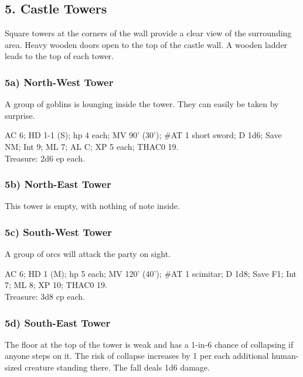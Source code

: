 \documentclass[english,12pt,openany,letterpaper]{book}
\begin{document}
\break

\subsection{5. Castle Towers}

Square towers at the corners of the wall provide a clear view of the surrounding area. Heavy wooden doors open to the top of the castle wall. A wooden ladder leads to the top of each tower.

\subsubsection{5a) North-West Tower}

A group of goblins is lounging inside the tower. They can easily be taken by surprise.

AC 6; HD 1-1 (S); hp 4 each; MV 90' (30'); \#AT 1 short sword; D 1d6; Save NM; Int 9; ML 7; AL C; XP 5 each; THAC0 19.
\\Treasure: 2d6 ep each.

\subsubsection{5b) North-East Tower}

This tower is empty, with nothing of note inside.

\subsubsection{5c) South-West Tower}

A group of orcs will attack the party on sight.

AC 6; HD 1 (M); hp 5 each; MV 120' (40'); \#AT 1 scimitar; D 1d8; Save F1; Int 7; ML 8; XP 10; THAC0 19.
\\Treasure: 3d8 cp each.

\subsubsection{5d) South-East Tower}

The floor at the top of the tower is weak and has a 1-in-6 chance of collapsing if anyone steps on it. The risk of collapse increases by 1 per each additional human-sized creature standing there. The fall deals 1d6 damage.

\clearpage
\end{document}

